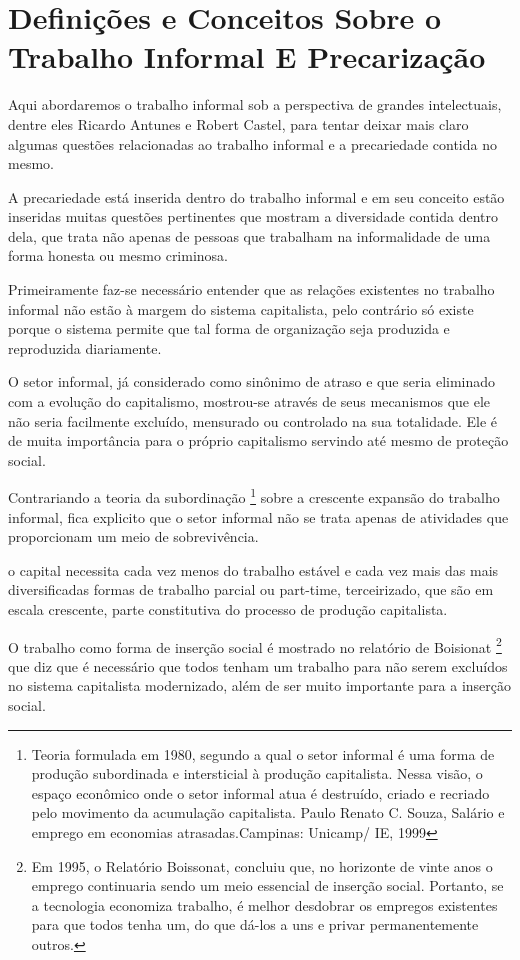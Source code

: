 \chapter{Definições e Conceitos Sobre o Trabalho Informal E Precarização}

Aqui abordaremos o trabalho informal sob a perspectiva de grandes intelectuais, dentre eles Ricardo Antunes e Robert Castel, para tentar deixar mais claro algumas questões relacionadas ao trabalho informal e a precariedade contida no mesmo. 

A precariedade está inserida dentro do trabalho informal e em seu conceito estão inseridas muitas questões pertinentes que mostram a diversidade contida dentro dela, que trata não apenas de pessoas que trabalham na informalidade de uma forma honesta ou mesmo criminosa.

Primeiramente faz-se necessário entender que as relações existentes no trabalho informal não estão à margem do sistema capitalista, pelo contrário só existe porque o sistema permite que tal forma de organização seja produzida e reproduzida diariamente. 

O setor informal, já considerado como sinônimo de atraso e que seria eliminado com a evolução do capitalismo, mostrou-se através de seus mecanismos que ele não seria facilmente excluído, mensurado ou controlado na sua totalidade. Ele é de muita importância para o próprio capitalismo servindo até mesmo de proteção social. 

Contrariando a teoria da subordinação \footnote{Teoria formulada em 1980, segundo a qual o setor informal é uma forma de produção subordinada e intersticial à produção capitalista. Nessa visão, o espaço econômico onde o setor informal atua é destruído, criado e recriado pelo movimento da acumulação capitalista. Paulo Renato C. Souza, Salário e emprego em economias atrasadas.Campinas: Unicamp/ IE, 1999} sobre a crescente expansão do trabalho informal, fica explicito que o setor informal não se trata apenas de atividades que proporcionam um meio de sobrevivência.

\begin{citacao}
o capital necessita cada vez menos do trabalho estável e cada vez mais das mais 
diversificadas formas de trabalho parcial ou part-time, terceirizado, que são em 
escala crescente, parte constitutiva do processo de produção capitalista. \cite{antunes2011modos}
\end{citacao}

O trabalho como forma de inserção social é mostrado no relatório de Boisionat \footnote{Em 1995, o Relatório Boissonat, concluiu que, no horizonte de vinte anos o emprego continuaria sendo um meio essencial de inserção social. Portanto, se a tecnologia economiza trabalho, é melhor desdobrar os empregos existentes para que todos tenha um, do que dá-los a uns e privar permanentemente outros.} que diz que é necessário que todos tenham um trabalho para não serem excluídos no sistema capitalista modernizado, além de ser muito importante para a inserção social.

